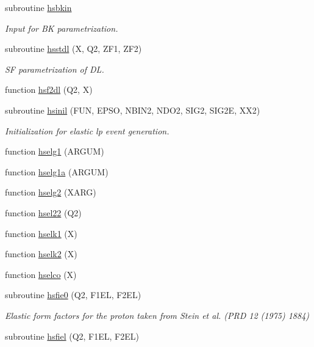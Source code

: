 \begin{DoxyCompactItemize}
subroutine \hyperlink{djangoh__h_8f_a5e61ca26c7b285c1b231be49df0c1fdb}{hsbkin}
\begin{DoxyCompactList}\small\item\em Input for BK parametrization. \end{DoxyCompactList}\item 
subroutine \hyperlink{djangoh__h_8f_a69a769d947e8150681e184e966997652}{hsstdl} (X, Q2, Z\+F1, Z\+F2)
\begin{DoxyCompactList}\small\item\em SF parametrization of DL. \end{DoxyCompactList}\item 
function \hyperlink{djangoh__h_8f_a889395a2e5655e2cea59aa3215b56ff8}{hsf2dl} (Q2, X)
\item 
subroutine \hyperlink{djangoh__h_8f_a3b2f69058ed4caa4de9dcd7a354e5a66}{hsinil} (F\+UN, E\+P\+SO, N\+B\+I\+N2, N\+D\+O2, S\+I\+G2, S\+I\+G2E, X\+X2)
\begin{DoxyCompactList}\small\item\em Initialization for elastic lp event generation. \end{DoxyCompactList}\item 
function \hyperlink{djangoh__h_8f_ac3a86192d187044a13047ea990ad9079}{hselg1} (A\+R\+G\+UM)
\item 
function \hyperlink{djangoh__h_8f_ae3b7e021ca653222e9704c83c1c62d24}{hselg1a} (A\+R\+G\+UM)
\item 
function \hyperlink{djangoh__h_8f_a31c1778a5988cfebe7a8c9fc65d561cf}{hselg2} (X\+A\+RG)
\item 
function \hyperlink{djangoh__h_8f_a444405a7ca832443f03f235ab4efea18}{hsel22} (Q2)
\item 
function \hyperlink{djangoh__h_8f_a52675b786d943b4b137f55f92362885f}{hselk1} (X)
\item 
function \hyperlink{djangoh__h_8f_abfd1ed17ed52e9e98daa59db1fdd5593}{hselk2} (X)
\item 
function \hyperlink{djangoh__h_8f_a97c6a1c094567f2b4a4bd8e79ce664eb}{hselco} (X)
\item 
subroutine \hyperlink{djangoh__h_8f_a8c3ca4edf306f5b2b276da4dfee854d7}{hsfie0} (Q2, F1\+EL, F2\+EL)
\begin{DoxyCompactList}\small\item\em Elastic form factors for the proton taken from Stein et al. (P\+RD 12 (1975) 1884) \end{DoxyCompactList}\item 
subroutine \hyperlink{djangoh__h_8f_aa7cd38bce4aef6013280e31f71bdc178}{hsfiel} (Q2, F1\+EL, F2\+EL)

\end{DoxyCompactItemize}
